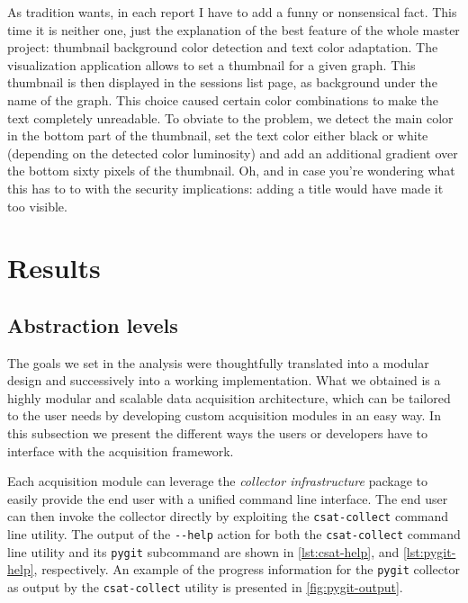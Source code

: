 As tradition wants, in each report I have to add a funny or nonsensical fact. This time it is neither one, just the explanation of the best feature of the whole master project: thumbnail background color detection and text color adaptation. The visualization application allows to set a thumbnail for a given graph. This thumbnail is then displayed in the sessions list page, as background under the name of the graph. This choice caused certain color combinations to make the text completely unreadable. To obviate to the problem, we detect the main color in the bottom part of the thumbnail, set the text color either black or white (depending on the detected color luminosity) and add an additional gradient over the bottom sixty pixels of the thumbnail. Oh, and in case you're wondering what this has to to with the security implications: adding a title would have made it too visible.

\section{Results}
\label{sec:acquisition/results}

\subsection{Abstraction levels}

The goals we set in the analysis were thoughtfully translated into a modular design and successively into a working implementation. What we obtained is a highly modular and scalable data acquisition architecture, which can be tailored to the user needs by developing custom acquisition modules in an easy way. In this subsection we present the different ways the users or developers have to interface with the acquisition framework.

Each acquisition module can leverage the \emph{collector infrastructure} package to easily provide the end user with a unified command line interface. The end user can then invoke the collector directly by exploiting the \texttt{csat-collect} command line utility. The output of the \texttt{-{}-help} action for both the \texttt{csat-collect} command line utility and its \texttt{pygit} subcommand are shown in \vref{lst:csat-help}, and \vref{lst:pygit-help}, respectively. An example of the progress information for the \texttt{pygit} collector as output by the \texttt{csat-collect} utility is presented in \ref{fig:pygit-output}.

